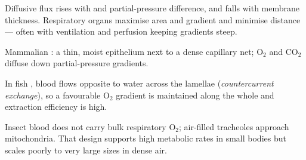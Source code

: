\begin{proposition}
\label{prop:g12:animal-exchange:fick}
Diffusive flux rises with  and partial-pressure difference,
and falls with membrane thickness. Respiratory organs maximise area and
gradient and minimise distance --- often with ventilation and perfusion
keeping gradients steep.
\end{proposition}
\admitted

\begin{omfigure}

{\small Mammalian : a thin, moist epithelium next to a dense
capillary net; O$_2$ and CO$_2$ diffuse down partial-pressure gradients.}
\end{omfigure}

\begin{definition}
\label{def:g12:animal-exchange:counter}
In fish , blood flows opposite to water across the lamellae
(\emph{countercurrent exchange}), so a
favourable O$_2$ gradient is maintained along the whole  and extraction efficiency is high.
\end{definition}

\begin{example}\label{ex:g12:animal-exchange:trachea}
Insect blood does not carry bulk respiratory O$_2$; air-filled tracheoles
approach mitochondria. That design supports high metabolic rates in
small bodies but scales poorly to very large sizes in dense air.
\end{example}

